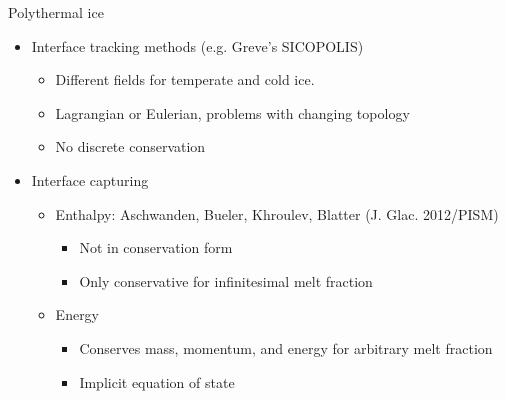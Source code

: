 \begin{frame}{Polythermal ice}
  \begin{itemize}
  \item Interface tracking methods (e.g. Greve's SICOPOLIS)
    \begin{itemize}
    \item Different fields for temperate and cold ice.
    \item Lagrangian or Eulerian, problems with changing topology
    \item No discrete conservation
    \end{itemize}
  \item Interface capturing
    \begin{itemize}
    \item Enthalpy: Aschwanden, Bueler, Khroulev, Blatter (J. Glac. 2012/PISM)
      \begin{itemize}
      \item Not in conservation form
      \item Only conservative for infinitesimal melt fraction
      \end{itemize}
    \item Energy
      \begin{itemize}
      \item Conserves mass, momentum, and energy for arbitrary melt fraction
      \item Implicit equation of state
      \end{itemize}
    \end{itemize}
  \end{itemize}
\end{frame}
